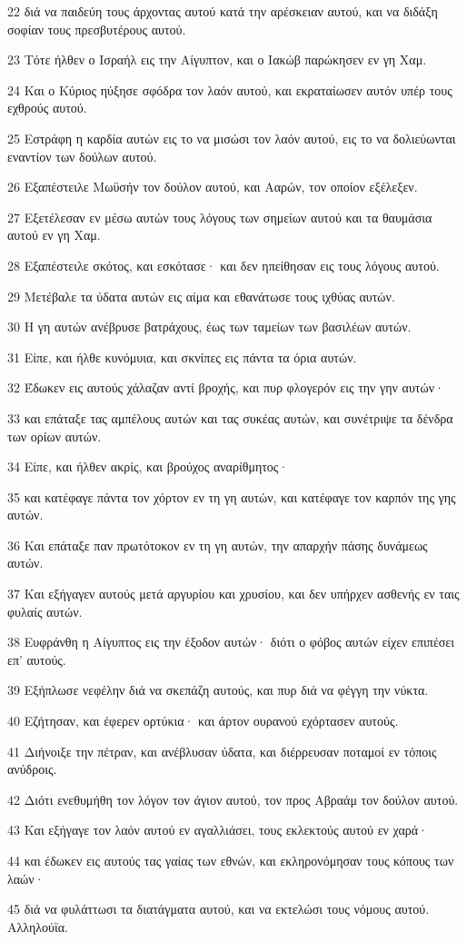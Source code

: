 \par 22 διά να παιδεύη τους άρχοντας αυτού κατά την αρέσκειαν αυτού, και να διδάξη σοφίαν τους πρεσβυτέρους αυτού.
\par 23 Τότε ήλθεν ο Ισραήλ εις την Αίγυπτον, και ο Ιακώβ παρώκησεν εν γη Χαμ.
\par 24 Και ο Κύριος ηύξησε σφόδρα τον λαόν αυτού, και εκραταίωσεν αυτόν υπέρ τους εχθρούς αυτού.
\par 25 Εστράφη η καρδία αυτών εις το να μισώσι τον λαόν αυτού, εις το να δολιεύωνται εναντίον των δούλων αυτού.
\par 26 Εξαπέστειλε Μωϋσήν τον δούλον αυτού, και Ααρών, τον οποίον εξέλεξεν.
\par 27 Εξετέλεσαν εν μέσω αυτών τους λόγους των σημείων αυτού και τα θαυμάσια αυτού εν γη Χαμ.
\par 28 Εξαπέστειλε σκότος, και εσκότασε· και δεν ηπείθησαν εις τους λόγους αυτού.
\par 29 Μετέβαλε τα ύδατα αυτών εις αίμα και εθανάτωσε τους ιχθύας αυτών.
\par 30 Η γη αυτών ανέβρυσε βατράχους, έως των ταμείων των βασιλέων αυτών.
\par 31 Είπε, και ήλθε κυνόμυια, και σκνίπες εις πάντα τα όρια αυτών.
\par 32 Έδωκεν εις αυτούς χάλαζαν αντί βροχής, και πυρ φλογερόν εις την γην αυτών·
\par 33 και επάταξε τας αμπέλους αυτών και τας συκέας αυτών, και συνέτριψε τα δένδρα των ορίων αυτών.
\par 34 Είπε, και ήλθεν ακρίς, και βρούχος αναρίθμητος·
\par 35 και κατέφαγε πάντα τον χόρτον εν τη γη αυτών, και κατέφαγε τον καρπόν της γης αυτών.
\par 36 Και επάταξε παν πρωτότοκον εν τη γη αυτών, την απαρχήν πάσης δυνάμεως αυτών.
\par 37 Και εξήγαγεν αυτούς μετά αργυρίου και χρυσίου, και δεν υπήρχεν ασθενής εν ταις φυλαίς αυτών.
\par 38 Ευφράνθη η Αίγυπτος εις την έξοδον αυτών· διότι ο φόβος αυτών είχεν επιπέσει επ' αυτούς.
\par 39 Εξήπλωσε νεφέλην διά να σκεπάζη αυτούς, και πυρ διά να φέγγη την νύκτα.
\par 40 Εζήτησαν, και έφερεν ορτύκια· και άρτον ουρανού εχόρτασεν αυτούς.
\par 41 Διήνοιξε την πέτραν, και ανέβλυσαν ύδατα, και διέρρευσαν ποταμοί εν τόποις ανύδροις.
\par 42 Διότι ενεθυμήθη τον λόγον τον άγιον αυτού, τον προς Αβραάμ τον δούλον αυτού.
\par 43 Και εξήγαγε τον λαόν αυτού εν αγαλλιάσει, τους εκλεκτούς αυτού εν χαρά·
\par 44 και έδωκεν εις αυτούς τας γαίας των εθνών, και εκληρονόμησαν τους κόπους των λαών·
\par 45 διά να φυλάττωσι τα διατάγματα αυτού, και να εκτελώσι τους νόμους αυτού. Αλληλούϊα.

